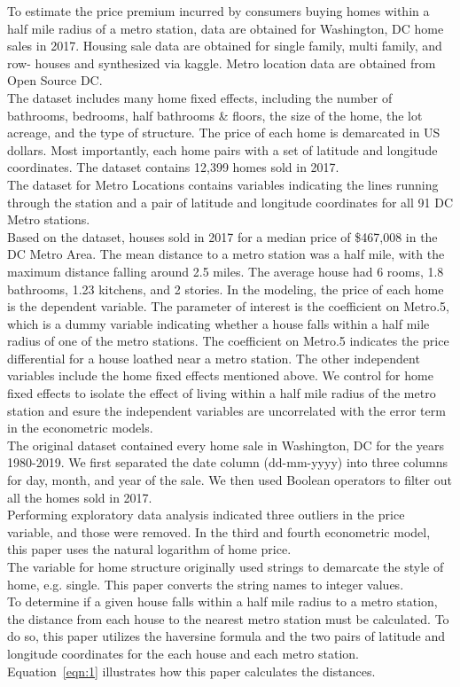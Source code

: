 \documentclass[12pt]{report}
\newcommand\tab[1][.50cm]{\hspace*{#1}}
\begin{document}
To estimate the price premium incurred by consumers buying homes within a half mile radius of a metro station, data are obtained for Washington, DC home sales in 2017. Housing sale data are obtained for single family, multi family, and row- houses and synthesized via kaggle. Metro location data are obtained from Open Source DC. \\
\tab The dataset includes many home fixed effects, including the number of bathrooms, bedrooms, half bathrooms \& floors, the size of the home, the lot acreage, and the type of structure. The price of each home is demarcated in US dollars. Most importantly, each home pairs with a set of latitude and longitude coordinates. The dataset contains 12,399 homes sold in 2017. \\
\tab The dataset for Metro Locations contains variables indicating the lines running through the station and a pair of latitude and longitude coordinates for all 91 DC Metro stations.\\
\tab Based on the dataset, houses sold in 2017 for a median price of \$467,008 in the DC Metro Area. The mean distance to a metro station was a half mile, with the maximum distance falling around 2.5 miles. The average house had 6 rooms, 1.8 bathrooms, 1.23 kitchens, and 2 stories.
\tab In the modeling, the price of each home is the dependent variable. The parameter of interest is the coefficient on Metro.5, which is a dummy variable indicating whether a house falls within a half mile radius of one of the metro stations. The coefficient on Metro.5 indicates the price differential for a house loathed near a metro station. The other independent variables include the home fixed effects mentioned above. We control for home fixed effects to isolate the effect of living within a half mile radius of the metro station and esure the independent variables are uncorrelated with the error term in the econometric models.\\
\tab The original dataset contained every home sale in Washington, DC for the years 1980-2019. We first separated the date column (dd-mm-yyyy) into three columns for day, month, and year of the sale. We then used Boolean operators to filter out all the homes sold in 2017.\\
\tab Performing exploratory data analysis indicated three outliers in the price variable, and those were removed. In the third and fourth econometric model, this paper uses the natural logarithm of home price. \\
\tab The variable for home structure originally used strings to demarcate the style of home, e.g. single. This paper converts the string names to integer values.\\
\tab To determine if a given house falls within a half mile radius to a metro station, the distance from each house to the nearest metro station must be calculated. To do so, this paper utilizes the haversine formula and the two pairs of latitude and longitude coordinates for the each house and each metro station. Equation~\ref{eqn:1} illustrates how this paper calculates the distances.
\end{document}
